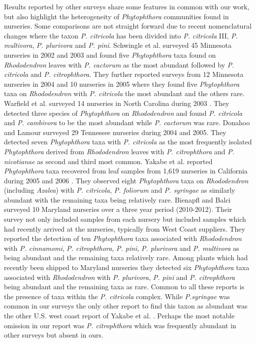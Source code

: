 \documentclass[12pt]{article}
\begin{document}
Results reported by other surveys share some features in common with our work, but also highlight the heterogeneity of \emph{Phytophthora} communities found in nurseries.  Some comparisons are not straight forward due to recent nomenclatural changes where the taxon \emph{P. citricola} has been divided into \emph{P. citricola} III, \emph{P. multivora}, \emph{P. plurivora} and \emph{P. pini}\cite{jung_burgess_2009, hong2011}.  Schwingle et al.\cite{schwingle_etal_2007} surveyed 45 Minnesota nurseries in 2002 and 2003 and found five \emph{Phytophthora} taxa found on \emph{Rhododendron} leaves with \emph{P. cactorum} as the most abundant followed by \emph{P. citricola} and \emph{P. citrophthora}.  They further reported surveys from 12 Minnesota nurseries in 2004 and 10 nurseries in 2005 where they found five \emph{Phytophthora} taxa on \emph{Rhododendron} with \emph{P. citricola} the most abundant and the others rare.  Warfield et al. surveyed 14 nurseries in North Carolina during 2003 \cite{warfield_etal_2008}.  They detected three species of \emph{Phytophthora} on \emph{Rhododendron} and found \emph{P. citricola} and \emph{P. cambivora} to be the most abundant while \emph{P. cactorum} was rare.  Donahoo and Lamour surveyed 29 Tennessee nurseries during 2004 and 2005\cite{donahoo_lamour_2008}.  They detected seven \emph{Phytophthora} taxa with \emph{P. citricola} as the most frequently isolated \emph{Phytophthora} derived from \emph{Rhododendron} leaves with \emph{P. citrophthora} and \emph{P. nicotianae} as second and third most common.  Yakabe et al. reported \emph{Phytophthora} taxa recovered from leaf samples from 1,619 nurseries in California during 2005 and 2006 \cite{yakabe_etal_2009}.  They observed eight \emph{Phytophthora} taxa on \emph{Rhododendron} (including \emph{Azalea}) with \emph{P. citricola}, \emph{P. foliorum} and \emph{P. syringae} as similarly abundant with the remaining taxa being relatively rare.  Bienapfl and Balci \cite{bienapfl_balci_2013} surveyed 10 Maryland nurseries over a three year period (2010-2012).  Their survey not only included samples from each nursery but included samples which had recently arrived at the nurseries, typically from West Coast suppliers.  They reported the detection of ten \emph{Phytophthora} taxa associated with \emph{Rhododendron} with \emph{P. cinnamomi}, \emph{P. citrophthora}, \emph{P. pini}, \emph{P. plurivora} and \emph{P. multivora} as being abundant and the remaining taxa relatively rare.  Among plants which had recently been shipped to Maryland nurseries they detected six \emph{Phytophthora} taxa associated with \emph{Rhododendron} with \emph{P. plurivora}, \emph{P. pini} and \emph{P. citrophthora} being abundant and the remaining taxa as rare.  Common to all these reports is the presence of taxa within the \emph{P. citricola} complex.  While \emph{P.syringae} was common in our surveys the only other report to find this taxon as abundant was the other U.S. west coast report of Yakabe et al. \cite{yakabe_etal_2009}.  Perhaps the most notable omission in our report was \emph{P. citrophthora} which was frequently abundant in other surveys but absent in ours.
\end{document}
